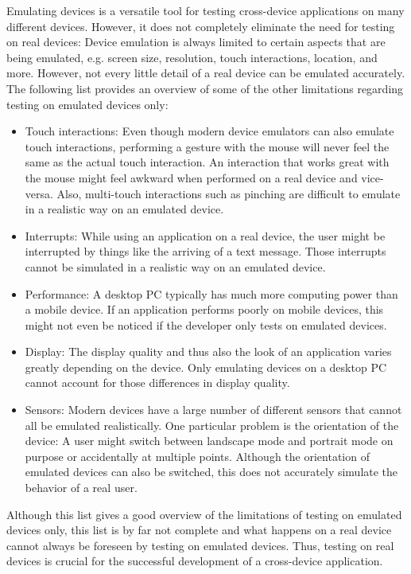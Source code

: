 Emulating devices is a versatile tool for testing cross-device applications on many different devices. However, it does not completely eliminate the need for testing on real devices: Device emulation is always limited to certain aspects that are being emulated, e.g. screen size, resolution, touch interactions, location, and more. However, not every little detail of a real device can be emulated accurately. The following list provides an overview of some of the other limitations regarding testing on emulated devices only:
\begin{itemize}
	\item Touch interactions: Even though modern device emulators can also emulate touch interactions, performing a gesture with the mouse will never feel the same as the actual touch interaction. An interaction that works great with the mouse might feel awkward when performed on a real device and vice-versa. Also, multi-touch interactions such as pinching are difficult to emulate in a realistic way on an emulated device.
	\item Interrupts: While using an application on a real device, the user might be interrupted by things like the arriving of a text message. Those interrupts cannot be simulated in a realistic way on an emulated device.
	\item Performance: A desktop PC typically has much more computing power than a mobile device. If an application performs poorly on mobile devices, this might not even be noticed if the developer only tests on emulated devices.
	\item Display: The display quality and thus also the look of an application varies greatly depending on the device. Only emulating devices on a desktop PC cannot account for those differences in display quality. 
	\item Sensors: Modern devices have a large number of different sensors that cannot all be emulated realistically. One particular problem is the orientation of the device: A user might switch between landscape mode and portrait mode on purpose or accidentally at multiple points. Although the orientation of emulated devices can also be switched, this does not accurately simulate the behavior of a real user.
\end{itemize}
Although this list gives a good overview of the limitations of testing on emulated devices only, this list is by far not complete and what happens on a real device cannot always be foreseen by testing on emulated devices. Thus, testing on real devices is crucial for the successful development of a cross-device application. 

